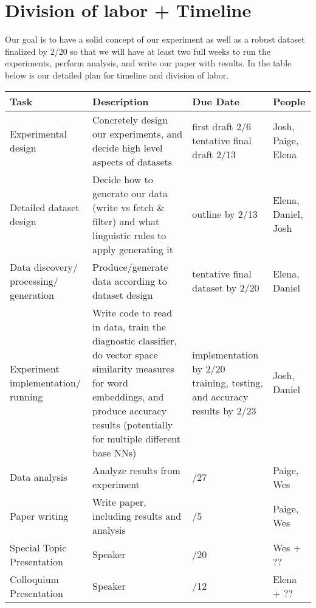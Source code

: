 \documentclass[11pt,a4paper]{article}
\begin{document}
\vspace{15mm}





\section{Division of labor + Timeline}
Our goal is to have a solid concept of our experiment as well as a robust dataset finalized by 2/20 so that we will have at least two full weeks to run the experiments, perform analysis, and write our paper with results. In the table below is our detailed plan for timeline and division of labor.

\clearpage

\begin{tabularx}{1.01\textwidth} { 
  | >{\raggedright\arraybackslash}X 
  | >{\centering\arraybackslash}X 
  | >{\centering\arraybackslash}X 
  | >{\raggedleft\arraybackslash}X | }
 \hline
 \textbf{Task} & \textbf{Description} & \textbf{Due Date}  & \textbf{People} \\
 \hline
 Experimental design  &  Concretely design our experiments, and decide high level aspects of datasets
 & {first draft 2/6 \newline
 tentative final draft 2/13} & Josh, Paige, Elena \\
  \hline
 Detailed dataset design  & Decide how to generate our data (write vs fetch \newline \& filter) and what linguistic rules to apply generating 
 it
  & outline by 2/13 & Elena, Daniel, Josh \\
      \hline
 Data discovery\// processing\// generation  & Produce\//generate data according to dataset design
  & tentative final dataset by 2/20 & Elena, Daniel \\
  
      \hline
Experiment implementation\// running & Write code to read in data, train the diagnostic classifier, do vector space similarity measures for word embeddings, and produce accuracy results (potentially for multiple different base NNs)

  &  implementation by 2/20 \newline \newline
  training, testing, and accuracy results by 2/23 & Josh, Daniel \\
  
   \hline
 Data analysis & Analyze results from experiment
  &  2/27 & Paige, Wes \\
    
   \hline
 Paper writing & Write paper, including results and analysis
  &  3/5 & Paige, Wes \\
   \hline
Special Topic Presentation & Speaker
  &  2/20 & Wes + ?? \\
     \hline
Colloquium Presentation
 & Speaker
  &  3/12 & Elena + ?? \\
  
  

\hline
\end{tabularx}

\clearpage



\end{document}
